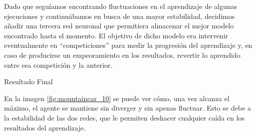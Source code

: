 Dado que seguíamos encontrando fluctuaciones en el aprendizaje de algunas ejecuciones y continuábamos en busca de una mayor estabilidad, decidimos añadir una tercera red neuronal que permitiera almacenar el mejor modelo encontrado hasta el momento. El objetivo de dicho modelo era intervenir eventualmente en ``competiciones'' para medir la progresión del aprendizaje y, en caso de producirse un empeoramiento en los resultados, revertir lo aprendido entre esa competición y la anterior.

%
       {Resultado Final}

En la imagen \ref{fig:mountaincar_10} se puede ver cómo, una vez alcanza el máximo, el agente se mantiene sin diverger y sin apenas fluctuar. Esto se debe a la estabilidad de las dos redes, que le permiten deshacer cualquier caída en los resultados del aprendizaje.

